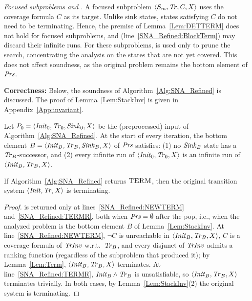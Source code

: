 \textit{Focused subproblems and \blockTerm.}
A focused subproblem $\langle S_m, \mathit{Tr}, C, X \rangle$ uses the coverage formula $C$ as its target.
Unlike sink states, states satisfying $C$ do not need to be terminating.
Hence, the premise of Lemma~\ref{Lem:DETTERM} does not hold for focused subproblems, and
\blockTerm (line~\ref{SNA_Refined:BlockTerm}) may discard their infinite runs.
For these subproblems, \blockTerm is used only to prune the search, concentrating the analysis on
the states that are not yet covered.
This does not affect soundness, as the original problem remains the bottom element of $\mathit{Prs}$.

\textbf{Correctness:} Below, the soundness of Algorithm~\ref{Alg:SNA_Refined} is discussed.
The proof of Lemma~\ref{Lem:StackInv} is given in Appendix~\ref{App:invariant}.

\begin{lemma}\label{Lem:StackInv}
    Let $P_0 = \langle \mathit{Init}_0, \mathit{Tr}_0, \mathit{Sink}_0, X \rangle$ be the (preprocessed) input of Algorithm~\ref{Alg:SNA_Refined}.
    At the start of every iteration, the bottom element $B = \langle \mathit{Init}_B, \mathit{Tr}_B, \mathit{Sink}_B, X \rangle$ of $\mathit{Prs}$ satisfies:
    (1) no $\mathit{Sink}_B$ state has a $\mathit{Tr}_B$-successor, and
    (2) every infinite run of $\langle \mathit{Init}_0, \mathit{Tr}_0, X \rangle$ is an infinite run of $\langle \mathit{Init}_B, \mathit{Tr}_B, X \rangle$.
\end{lemma}

\begin{lemma}\label{Lem:FinalTermination}
    If Algorithm~\ref{Alg:SNA_Refined} returns $\textsc{TERM}$, then the original transition system $\langle \mathit{Init}, \mathit{Tr}, X \rangle$ is terminating.
\end{lemma}
\begin{proof}
    \TERM is returned only at lines~\ref{SNA_Refined:NEWTERM} and~\ref{SNA_Refined:TERMR}, both when $\mathit{Prs} = \emptyset$ after the pop,
    i.e., when the analyzed problem is the bottom element $B$ of Lemma~\ref{Lem:StackInv}.
    At line~\ref{SNA_Refined:NEWTERM}, $\lnot C$ is unreachable in $\langle \mathit{Init}_B, \mathit{Tr}_B, X \rangle$, $C$ is a coverage formula of $\mathit{TrInv}$
    w.r.t.\ $\mathit{Tr}_B$, and every disjunct of $\mathit{TrInv}$ admits a ranking function (regardless of the subproblem that produced it);
    by Lemma~\ref{Lem:Term}, $\langle \mathit{Init}_B, \mathit{Tr}_B, X \rangle$ terminates.
    At line~\ref{SNA_Refined:TERMR}, $\mathit{Init}_B \land \mathit{Tr}_B$ is unsatisfiable, so $\langle \mathit{Init}_B, \mathit{Tr}_B, X \rangle$ terminates trivially.
    In both cases, by Lemma~\ref{Lem:StackInv}(2) the original system is terminating.
\end{proof}

